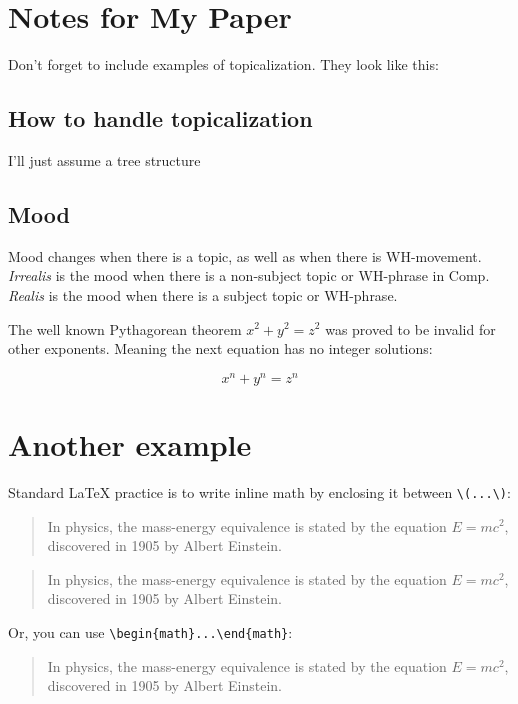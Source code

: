 \documentclass[12pt]{article}
\begin{document}
\section*{Notes for My Paper}

Don't forget to include examples of topicalization.
They look like this:

\subsection*{How to handle topicalization}

I'll just assume a tree structure


\subsection*{Mood}

Mood changes when there is a topic, as well as when
there is WH-movement.  \emph{Irrealis} is the mood when
there is a non-subject topic or WH-phrase in Comp.
\emph{Realis} is the mood when there is a subject topic
or WH-phrase.

The well known Pythagorean theorem \(x^2 + y^2 = z^2\) was
proved to be invalid for other exponents.
Meaning the next equation has no integer solutions:

\[ x^n + y^n = z^n \]

\section{Another example}

\noindent Standard \LaTeX{} practice is to write inline math by enclosing it between \verb|\(...\)|:

\begin{quote}
    In physics, the mass-energy equivalence is stated
    by the equation \(E=mc^2\), discovered in 1905 by Albert Einstein.
\end{quote}

\begin{quote}
    In physics, the mass-energy equivalence is stated
    by the equation \(E=mc^2\), discovered in 1905 by Albert Einstein.
\end{quote}

\noindent Or, you can use \verb|\begin{math}...\end{math}|:

\begin{quote}
    In physics, the mass-energy equivalence is stated
    by the equation \begin{math}E=mc^2\end{math}, discovered in 1905 by Albert Einstein.
\end{quote}
\end{document}
